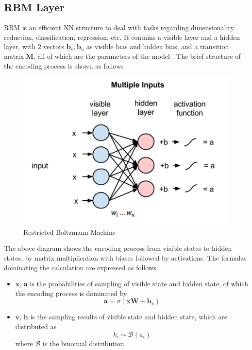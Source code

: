\documentclass[10pt]{article}
\begin{document}
\subsection{RBM Layer}
RBM is an efficient NN structure to deal with tasks regarding dimensionality reduction, classification, regression, etc. It contains a visible layer and a hidden layer, with $2$ vectors $\mathbf{b}_{\text{v}}, \mathbf{b}_{\text{h}}$ as visible bias and hidden bias, and a transition matrix $\mathbf{M}$, all of which are the parameters of the model \cite{hinton2006reducing}. The brief structure of the encoding process is shown as follows
\begin{figure}[H]
\centering
\includegraphics[scale=.5]{multiple_inputs_RBM.png}
\caption{Restricted Boltzmann Machine}
\label{rbm}
\end{figure}
The above diagram shows the encoding process from visible states to hidden states, by matrix multiplication with biases followed by activations. The formulas dominating the calculation are expressed as follows
\begin{itemize}
\item $\mathbf{x}$, $\mathbf{a}$ is the probabilities of sampling of visible state and hidden state, of which the encoding process is dominated by
$$\mathbf{a} = \sigma\left(\mathbf{x}\mathbf{W} + \mathbf{b}_{\text{h}}\right)$$
\item $\mathbf{v}$, $\mathbf{h}$ is the sampling results of visible state and hidden state, which are distributed as
$$h_i \sim \mathcal{B}\left(a_i\right)$$
where $\mathcal{B}$ is the binomial distribution.
\end{itemize}
\end{document}
